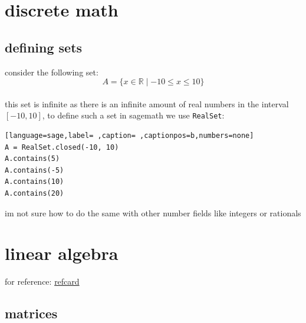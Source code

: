 \documentclass[a4paper,12pt]{article}
\begin{document}
\section{discrete math}
\label{sec:org587ee9f}
\subsection{defining sets}
\label{sec:org7de0087}

consider the following set:\\[0pt]

\[ A = \{x \in \mathbb{R} \mid -10 \leq x \leq 10\} \]\\[0pt]

this set is infinite as there is an infinite amount of real numbers in the interval \([-10, 10]\), to define such a set in sagemath we use \texttt{RealSet}:\\[0pt]

\begin{lstlisting}[language=sage,label= ,caption= ,captionpos=b,numbers=none]
A = RealSet.closed(-10, 10)
A.contains(5)
A.contains(-5)
A.contains(10)
A.contains(20)
\end{lstlisting}

im not sure how to do the same with other number fields like integers or rationals\\[0pt]
\section{linear algebra}
\label{sec:org69d7f10}
for reference: \href{./sage\_linear\_algebra\_refcard.pdf}{refcard}\\[0pt]
\subsection{matrices}
\label{sec:orge024463}
\end{document}
